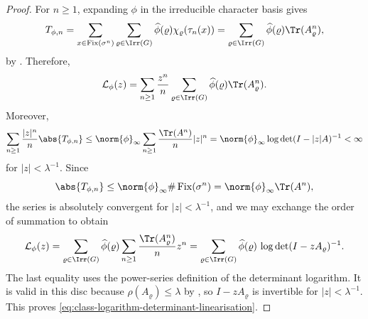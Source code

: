 \begin{proof}
  For \(n\ge 1\), expanding \(\phi\) in the irreducible character basis
  gives
  \[
    T_{\phi,n}
    =\sum_{x\in\operatorname{Fix}(\sigma^n)}
      \sum_{\varrho\in\Irr(G)}
        \widehat\phi(\varrho)\chi_\varrho(\tau_n(x))
    =\sum_{\varrho\in\Irr(G)}
      \widehat\phi(\varrho)\Tr(A_\varrho^n),
  \]
  by . Therefore,
  \[
    \mathcal L_\phi(z)
    =\sum_{n\ge 1}\frac{z^n}{n}
      \sum_{\varrho\in\Irr(G)}
        \widehat\phi(\varrho)\Tr(A_\varrho^n).
  \]
  Moreover,
  \[
    \sum_{n\ge 1}\frac{|z|^n}{n}\abs{T_{\phi,n}}
    \le
    \norm{\phi}_\infty
    \sum_{n\ge 1}\frac{\Tr(A^n)}{n}|z|^n
    =
    \norm{\phi}_\infty \log\det(I-|z|A)^{-1}
    <\infty
  \]
  for \(|z|<\lambda^{-1}\). Since
  \[
    \abs{T_{\phi,n}}
    \le \norm{\phi}_\infty \#\operatorname{Fix}(\sigma^n)
    =\norm{\phi}_\infty \Tr(A^n),
  \]
  the series is absolutely convergent for \(|z|<\lambda^{-1}\), and we
  may exchange the order of summation to obtain
  \[
    \mathcal L_\phi(z)
    =
    \sum_{\varrho\in\Irr(G)}
      \widehat\phi(\varrho)
      \sum_{n\ge 1}\frac{\Tr(A_\varrho^n)}{n}z^n
    =
    \sum_{\varrho\in\Irr(G)}
      \widehat\phi(\varrho)\,
      \log\det(I-zA_\varrho)^{-1}.
  \]
  The last equality uses the power-series definition of the determinant
  logarithm. It is valid in this disc because
  \(\rho(A_\varrho)\le \lambda\) by
  , so
  \(I-zA_\varrho\) is invertible for \(|z|<\lambda^{-1}\).
  This proves \eqref{eq:class-logarithm-determinant-linearisation}.
\end{proof}

